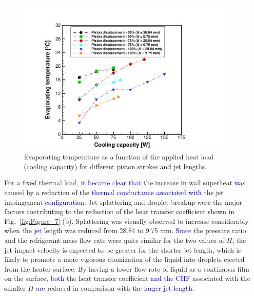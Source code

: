 \documentclass[review,preprint,12pt]{elsarticle}
\begin{document}
\begin{figure}[!htp]
\centering
\includegraphics[angle=0,scale=0.375]{Figure_8.pdf}
\caption{Evaporating temperature as a function of the applied heat load (cooling capacity) for different piston strokes and jet lengths.}
\label{fig:Figure_8}
\end{figure}

For a fixed thermal load, \textcolor{blue}{it became clear that} the increase in wall superheat \textcolor{blue}{was} caused by a reduction of the \textcolor{blue}{thermal conductance associated with} the jet impingement  \textcolor{blue}{configuration}. Jet splattering and droplet breakup were the major factors contributing to the reduction of the heat transfer coefficient shown in Fig.~\ref{fig:Figure_7} (b). Splattering was visually observed to increase considerably when the  \textcolor{blue}{jet} length was reduced from 28.84 to 9.75 mm.  \textcolor{blue}{Since} the pressure ratio and the refrigerant mass flow rate were quite similar for the two values of $H$, the jet impact velocity is expected to be greater for the shorter jet length, which is likely to promote a more vigorous atomization of the liquid into droplets ejected from the heater surface. By having a lower flow rate of liquid as a continuous film on the surface, \textcolor{blue}{both} the heat transfer coefficient \textcolor{blue}{and the CHF} associated with the smaller $H$ \textcolor{blue}{are} reduced in comparison with the \textcolor{blue}{larger jet length}. 
\end{document}
